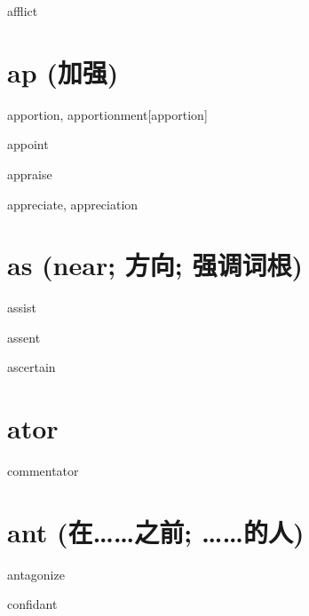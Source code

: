 \begin{RefWord}{afflict}
\end{RefWord}

\section{ap (加强)}

\begin{RefWord}{apportion, apportionment}[apportion]
\end{RefWord}

\begin{RefWord}{appoint}
\end{RefWord}

\begin{RefWord}{appraise}
\end{RefWord}

\begin{RefWord}{appreciate, appreciation}
\end{RefWord}

\section{as (near; 方向; 强调词根)}

\begin{RefWord}{assist}
\end{RefWord}

\begin{RefWord}{assent}
\end{RefWord}

\begin{RefWord}{ascertain}
\end{RefWord}

\section{ator}

\begin{RefWord}{commentator}
\end{RefWord}

\section{ant (在……之前; ……的人)}

\begin{RefWord}{antagonize}
\end{RefWord}

\begin{RefWord}{confidant}
\end{RefWord}


